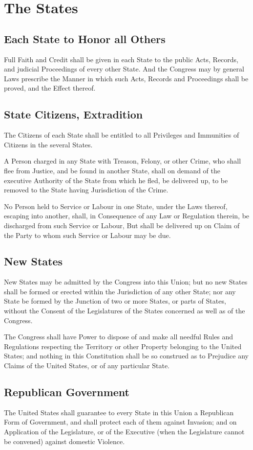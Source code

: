 \documentclass{constitution}
\begin{document}
\chapter{The States}
\section{Each State to Honor all Others}
Full Faith and Credit shall be given in each State
to the public Acts, Records, and judicial Proceedings of every other State.
And the Congress may by general Laws prescribe the Manner
in which such Acts, Records and Proceedings shall be proved, and the Effect thereof.

\section{State Citizens, Extradition}
The Citizens of each State shall be entitled
to all Privileges and Immunities of Citizens in the several States.

A Person charged in any State with Treason, Felony, or other Crime,
who shall flee from Justice, and be found in another State,
shall on demand of the executive Authority of the State from which he fled,
be delivered up, to be removed to the State having Jurisdiction of the Crime.

No Person held to Service or Labour in one State, under the Laws thereof,
escaping into another,
shall, in Consequence of any Law or Regulation therein,
be discharged from such Service or Labour,
But shall be delivered up on Claim of the Party to whom such Service or Labour may be due.

\section{New States}
New States may be admitted by the Congress into this Union;
but no new States shall be formed or erected within the Jurisdiction of any other State;
nor any State be formed by the Junction of two or more States, or parts of States,
without the Consent of the Legislatures of the States concerned as well as of the Congress.

The Congress shall have Power to dispose of and make all needful Rules and Regulations
respecting the Territory or other Property belonging to the United States;
and nothing in this Constitution shall be so construed
as to Prejudice any Claims of the United States, or of any particular State.

\section{Republican Government}
The United States shall guarantee to every State in this Union
a Republican Form of Government,
and shall protect each of them against Invasion;
and on Application of the Legislature,
or of the Executive (when the Legislature cannot be convened)
against domestic Violence.
\end{document}
